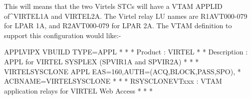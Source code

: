 \documentclass[letterpaper,10pt,english]{sphinxmanual}
\begin{document}
This will means that the two Virtels STCs will have a VTAM APPLID of\textasciicircum{}VIRTEL1A and VIRTEL2A. The Virtel relay LU names are R1AVT000-079 for LPAR 1A, and R2AVT000-079 for LPAR 2A.
The VTAM definition to support this configuration would like:-

\begin{sphinxVerbatim}[commandchars=\\\{\}]
APPLVIPX VBUILD TYPE=APPL
* \PYGZhy{}\PYGZhy{}\PYGZhy{}\PYGZhy{}\PYGZhy{}\PYGZhy{}\PYGZhy{}\PYGZhy{}\PYGZhy{}\PYGZhy{}\PYGZhy{}\PYGZhy{}\PYGZhy{}\PYGZhy{}\PYGZhy{}\PYGZhy{}\PYGZhy{}\PYGZhy{}\PYGZhy{}\PYGZhy{}\PYGZhy{}\PYGZhy{}\PYGZhy{}\PYGZhy{}\PYGZhy{}\PYGZhy{}\PYGZhy{}\PYGZhy{}\PYGZhy{}\PYGZhy{}\PYGZhy{}\PYGZhy{}\PYGZhy{}\PYGZhy{}\PYGZhy{}\PYGZhy{}\PYGZhy{}\PYGZhy{}\PYGZhy{}\PYGZhy{}\PYGZhy{}\PYGZhy{}\PYGZhy{}\PYGZhy{}\PYGZhy{}\PYGZhy{}\PYGZhy{}\PYGZhy{}\PYGZhy{}\PYGZhy{}\PYGZhy{}\PYGZhy{}\PYGZhy{}\PYGZhy{}\PYGZhy{}\PYGZhy{}\PYGZhy{}\PYGZhy{}\PYGZhy{}\PYGZhy{}\PYGZhy{}\PYGZhy{}\PYGZhy{}\PYGZhy{}\PYGZhy{}\PYGZhy{} *
* Product : VIRTEL                                                   *
* Description : APPL for VIRTEL SYSPLEX (SPVIR1A and SPVIR2A)        *
* \PYGZhy{}\PYGZhy{}\PYGZhy{}\PYGZhy{}\PYGZhy{}\PYGZhy{}\PYGZhy{}\PYGZhy{}\PYGZhy{}\PYGZhy{}\PYGZhy{}\PYGZhy{}\PYGZhy{}\PYGZhy{}\PYGZhy{}\PYGZhy{}\PYGZhy{}\PYGZhy{}\PYGZhy{}\PYGZhy{}\PYGZhy{}\PYGZhy{}\PYGZhy{}\PYGZhy{}\PYGZhy{}\PYGZhy{}\PYGZhy{}\PYGZhy{}\PYGZhy{}\PYGZhy{}\PYGZhy{}\PYGZhy{}\PYGZhy{}\PYGZhy{}\PYGZhy{}\PYGZhy{}\PYGZhy{}\PYGZhy{}\PYGZhy{}\PYGZhy{}\PYGZhy{}\PYGZhy{}\PYGZhy{}\PYGZhy{}\PYGZhy{}\PYGZhy{}\PYGZhy{}\PYGZhy{}\PYGZhy{}\PYGZhy{}\PYGZhy{}\PYGZhy{}\PYGZhy{}\PYGZhy{}\PYGZhy{}\PYGZhy{}\PYGZhy{}\PYGZhy{}\PYGZhy{}\PYGZhy{}\PYGZhy{}\PYGZhy{}\PYGZhy{}\PYGZhy{}\PYGZhy{}\PYGZhy{} *
VIRTEL\PYGZam{}SYSCLONE APPL EAS=160,AUTH=(ACQ,BLOCK,PASS,SPO),               *
      ACBNAME=VIRTEL\PYGZam{}SYSCLONE
* \PYGZhy{}\PYGZhy{}\PYGZhy{}\PYGZhy{}\PYGZhy{}\PYGZhy{}\PYGZhy{}\PYGZhy{}\PYGZhy{}\PYGZhy{}\PYGZhy{}\PYGZhy{}\PYGZhy{}\PYGZhy{}\PYGZhy{}\PYGZhy{}\PYGZhy{}\PYGZhy{}\PYGZhy{}\PYGZhy{}\PYGZhy{}\PYGZhy{}\PYGZhy{}\PYGZhy{}\PYGZhy{}\PYGZhy{}\PYGZhy{}\PYGZhy{}\PYGZhy{}\PYGZhy{}\PYGZhy{}\PYGZhy{}\PYGZhy{}\PYGZhy{}\PYGZhy{}\PYGZhy{}\PYGZhy{}\PYGZhy{}\PYGZhy{}\PYGZhy{}\PYGZhy{}\PYGZhy{}\PYGZhy{}\PYGZhy{}\PYGZhy{}\PYGZhy{}\PYGZhy{}\PYGZhy{}\PYGZhy{}\PYGZhy{}\PYGZhy{}\PYGZhy{}\PYGZhy{}\PYGZhy{}\PYGZhy{}\PYGZhy{}\PYGZhy{}\PYGZhy{}\PYGZhy{}\PYGZhy{}\PYGZhy{}\PYGZhy{}\PYGZhy{}\PYGZhy{}\PYGZhy{}\PYGZhy{} *
* R\PYGZam{}SYSCLONEVTxxx : VTAM application relays for VIRTEL Web Access    *
* \PYGZhy{}\PYGZhy{}\PYGZhy{}\PYGZhy{}\PYGZhy{}\PYGZhy{}\PYGZhy{}\PYGZhy{}\PYGZhy{}\PYGZhy{}\PYGZhy{}\PYGZhy{}\PYGZhy{}\PYGZhy{}\PYGZhy{}\PYGZhy{}\PYGZhy{}\PYGZhy{}\PYGZhy{}\PYGZhy{}\PYGZhy{}\PYGZhy{}\PYGZhy{}\PYGZhy{}\PYGZhy{}\PYGZhy{}\PYGZhy{}\PYGZhy{}\PYGZhy{}\PYGZhy{}\PYGZhy{}\PYGZhy{}\PYGZhy{}\PYGZhy{}\PYGZhy{}\PYGZhy{}\PYGZhy{}\PYGZhy{}\PYGZhy{}\PYGZhy{}\PYGZhy{}\PYGZhy{}\PYGZhy{}\PYGZhy{}\PYGZhy{}\PYGZhy{}\PYGZhy{}\PYGZhy{}\PYGZhy{}\PYGZhy{}\PYGZhy{}\PYGZhy{}\PYGZhy{}\PYGZhy{}\PYGZhy{}\PYGZhy{}\PYGZhy{}\PYGZhy{}\PYGZhy{}\PYGZhy{}\PYGZhy{}\PYGZhy{}\PYGZhy{}\PYGZhy{}\PYGZhy{}\PYGZhy{} *

\end{sphinxVerbatim}
\end{document}
